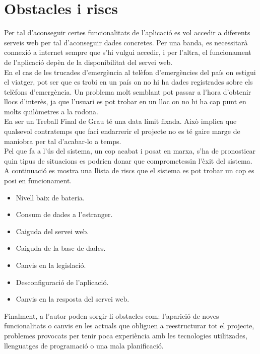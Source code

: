 \section{Obstacles i riscs}

Per tal d'aconseguir certes funcionalitats de l'aplicació es vol accedir a diferents serveis web per tal d'aconseguir dades concretes. Per una banda, es necessitarà connexió a internet sempre que s'hi vulgui accedir, i per l'altra, el funcionament de l'aplicació depèn de la disponibilitat del servei web.\\

En el cas de les trucades d'emergència al telèfon d'emergències del país on estigui el viatger, pot ser que es trobi en un país on no hi ha dades registrades sobre els telèfons d'emergència. Un problema molt semblant pot passar a l'hora d'obtenir llocs d'interès, ja que l'usuari es pot trobar en un lloc on no hi ha cap punt en molts quilòmetres a la rodona.\\

En ser un Treball Final de Grau té una data límit fixada. Això implica que qualsevol contratemps que faci endarrerir el projecte no es té gaire marge de maniobra per tal d'acabar-lo a temps.\\

Pel que fa a l'ús del sistema, un cop acabat i posat en marxa, s'ha de pronosticar quin tipus de situacions es podrien donar que comprometessin l'èxit del sistema. A continuació es mostra una llista de riscs que el sistema es pot trobar un cop es posi en funcionament.

\begin{itemize}
\item{}Nivell baix de bateria.
\item{}Consum de dades a l'estranger.
\item{}Caiguda del servei web.
\item{}Caiguda de la base de dades.
\item{}Canvis en la legislació.
\item{}Desconfiguració de l'aplicació.
\item{}Canvis en la resposta del servei web.
\end{itemize}

Finalment, a l'autor poden sorgir-li obstacles com: l'aparició de noves funcionalitats o canvis en les actuals que obliguen a reestructurar tot el projecte, problemes provocats per tenir poca experiència amb les tecnologies utilitzades, llenguatges de programació o una mala planificació.


